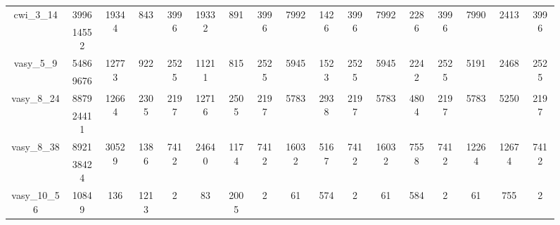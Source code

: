 \documentclass[../master/master.tex]{subfiles}
\begin{document}
\begin{figure}
\begin{adjustbox}{angle=90}
\begin{tabular}{ |c|c||c|c|c||c|c|c||c|c|c||c|c|c||c|c|c|| }
\hline
\multirow{2}{3.6em}{cwi\_3\_14} & 3996 & \multirow{2}{3.6em}{19344} & \multirow{2}{3.6em}{843} & \multirow{2}{3.6em}{3996} & \multirow{2}{3.6em}{19332} & \multirow{2}{3.6em}{891} & \multirow{2}{3.6em}{3996} & \multirow{2}{3.6em}{7992} & \multirow{2}{3.6em}{1426} & \multirow{2}{3.6em}{3996} & \multirow{2}{3.6em}{7992} & \multirow{2}{3.6em}{2286} & \multirow{2}{3.6em}{3996} & \multirow{2}{3.6em}{7990} & \multirow{2}{3.6em}{2413} & \multirow{2}{3.6em}{3996} \\
\cline{2-2}
 & 14552  &  &  &  &  &  &  &  &  &  &  &  &  &  &  &  \\
\hline
\multirow{2}{3.6em}{vasy\_5\_9} & 5486 & \multirow{2}{3.6em}{12773} & \multirow{2}{3.6em}{922} & \multirow{2}{3.6em}{2525} & \multirow{2}{3.6em}{11211} & \multirow{2}{3.6em}{815} & \multirow{2}{3.6em}{2525} & \multirow{2}{3.6em}{5945} & \multirow{2}{3.6em}{1523} & \multirow{2}{3.6em}{2525} & \multirow{2}{3.6em}{5945} & \multirow{2}{3.6em}{2242} & \multirow{2}{3.6em}{2525} & \multirow{2}{3.6em}{5191} & \multirow{2}{3.6em}{2468} & \multirow{2}{3.6em}{2525} \\
\cline{2-2}
 & 9676  &  &  &  &  &  &  &  &  &  &  &  &  &  &  &  \\
\hline
\multirow{2}{3.6em}{vasy\_8\_24} & 8879 & \multirow{2}{3.6em}{12664} & \multirow{2}{3.6em}{2305} & \multirow{2}{3.6em}{2197} & \multirow{2}{3.6em}{12716} & \multirow{2}{3.6em}{2505} & \multirow{2}{3.6em}{2197} & \multirow{2}{3.6em}{5783} & \multirow{2}{3.6em}{2938} & \multirow{2}{3.6em}{2197} & \multirow{2}{3.6em}{5783} & \multirow{2}{3.6em}{4804} & \multirow{2}{3.6em}{2197} & \multirow{2}{3.6em}{5783} & \multirow{2}{3.6em}{5250} & \multirow{2}{3.6em}{2197} \\
\cline{2-2}
 & 24411  &  &  &  &  &  &  &  &  &  &  &  &  &  &  &  \\
\hline
\multirow{2}{3.6em}{vasy\_8\_38} & 8921 & \multirow{2}{3.6em}{30529} & \multirow{2}{3.6em}{1386} & \multirow{2}{3.6em}{7412} & \multirow{2}{3.6em}{24640} & \multirow{2}{3.6em}{1174} & \multirow{2}{3.6em}{7412} & \multirow{2}{3.6em}{16032} & \multirow{2}{3.6em}{5167} & \multirow{2}{3.6em}{7412} & \multirow{2}{3.6em}{16032} & \multirow{2}{3.6em}{7558} & \multirow{2}{3.6em}{7412} & \multirow{2}{3.6em}{12264} & \multirow{2}{3.6em}{12674} & \multirow{2}{3.6em}{7412} \\
\cline{2-2}
 & 38424  &  &  &  &  &  &  &  &  &  &  &  &  &  &  &  \\
\hline
\multirow{2}{3.6em}{vasy\_10\_56} & 10849 & \multirow{2}{3.6em}{136} & \multirow{2}{3.6em}{1213} & \multirow{2}{3.6em}{2} & \multirow{2}{3.6em}{83} & \multirow{2}{3.6em}{2005} & \multirow{2}{3.6em}{2} & \multirow{2}{3.6em}{61} & \multirow{2}{3.6em}{574} & \multirow{2}{3.6em}{2} & \multirow{2}{3.6em}{61} & \multirow{2}{3.6em}{584} & \multirow{2}{3.6em}{2} & \multirow{2}{3.6em}{61} & \multirow{2}{3.6em}{755} & \multirow{2}{3.6em}{2} \\

\end{tabular}
\end{adjustbox}
\end{figure}
\end{document}
